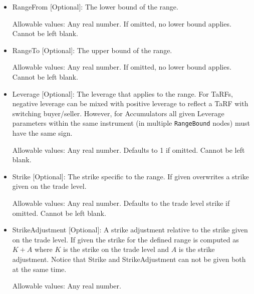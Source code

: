 \begin{itemize}
\item RangeFrom [Optional]: The lower bound of the range. 

Allowable values:  Any real number. If omitted, no lower bound applies. Cannot be left blank.

\item RangeTo [Optional]: The upper bound of the range. 

Allowable values:  Any real number. If omitted, no lower bound applies. Cannot be left blank.

\item Leverage [Optional]: The leverage that applies to the range. For TaRFs, negative leverage can be mixed with positive leverage to reflect a TaRF with switching buyer/seller. However, for Accumulators all given Leverage parameters within the same instrument (in multiple \lstinline!RangeBound! nodes) must have the same sign.

Allowable values:  Any real number. Defaults to 1 if omitted. Cannot be left blank.

\item Strike [Optional]: The strike specific to the range. If given overwrites a strike given on the trade level.

Allowable values:  Any real number. Defaults to the trade level strike if omitted. Cannot be left blank.

\item StrikeAdjustment [Optional]: A strike adjustment relative to the strike given on the trade level.  If given the
  strike for the defined range is computed as $K+A$ where $K$ is the strike on the trade level and $A$ is the strike
  adjustment. Notice that Strike and StrikeAdjustment can not be given both at the same time.

Allowable values:  Any real number.
\end{itemize}
